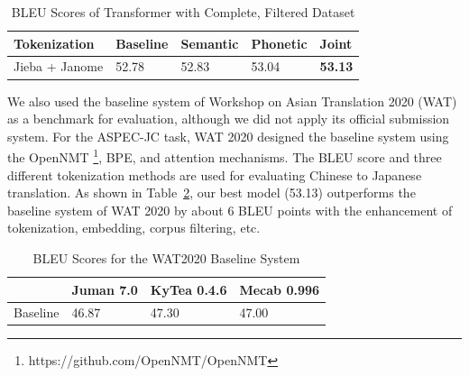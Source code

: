 \vspace{0.5cm}
\begin{table}[h]
    \centering
    \begin{tabularx}{\textwidth}{bbbbb}\toprule
        Tokenization & Baseline & Semantic & Phonetic & Joint \\\midrule
        Jieba + Janome & 52.78 & 52.83 & 53.04 & \textbf{53.13} \\\bottomrule
    \end{tabularx}
    \caption{BLEU Scores of Transformer with Complete, Filtered Dataset}
    \label{tab:transformer_filtered_bleu_score}
\end{table}

We also used the baseline system of Workshop on Asian Translation 2020 (WAT) \cite{nakazawa2020overview} as a benchmark for evaluation, although we did not apply its official submission system. For the ASPEC-JC task, WAT 2020 designed the baseline system using the OpenNMT \footnote{https://github.com/OpenNMT/OpenNMT}, BPE, and attention mechanisms. The BLEU score and three different tokenization methods are used for evaluating Chinese to Japanese translation. As shown in Table~\ref{tab:wat_2020}, our best model (53.13) outperforms the baseline system of WAT 2020 by about 6 BLEU points with the enhancement of tokenization, embedding, corpus filtering, etc.

\vspace{0.5cm}
\begin{table}[h]
    \centering
    \begin{tabularx}{\textwidth}{bbbb}\toprule
         & Juman 7.0 & KyTea 0.4.6 & Mecab 0.996 \\\midrule
        Baseline & 46.87 & 47.30 & 47.00 \\
    \end{tabularx}
    \caption{BLEU Scores for the WAT2020 Baseline System}
    \label{tab:wat_2020}
\end{table}




